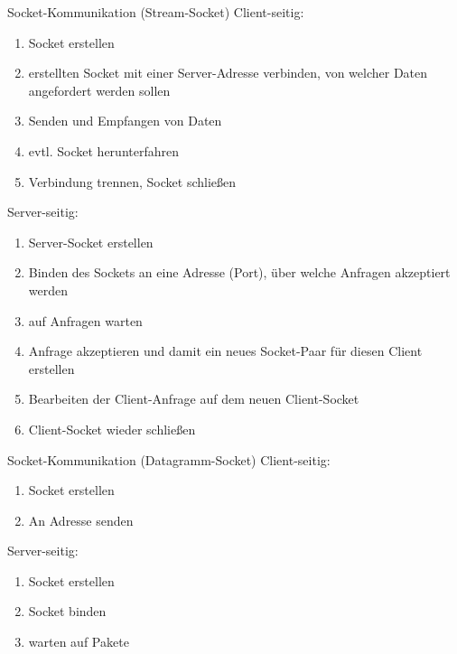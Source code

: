 \begin{defi}{Socket-Kommunikation (Stream-Socket)}
    Client-seitig:
    \begin{enumerate}
        \item Socket erstellen
        \item erstellten Socket mit einer Server-Adresse verbinden, von welcher Daten angefordert werden sollen
        \item Senden und Empfangen von Daten
        \item evtl. Socket herunterfahren
        \item Verbindung trennen, Socket schließen
    \end{enumerate}

    Server-seitig:
    \begin{enumerate}
        \item Server-Socket erstellen
        \item Binden des Sockets an eine Adresse (Port), über welche Anfragen akzeptiert werden
        \item auf Anfragen warten
        \item Anfrage akzeptieren und damit ein neues Socket-Paar für diesen Client erstellen
        \item Bearbeiten der Client-Anfrage auf dem neuen Client-Socket
        \item Client-Socket wieder schließen
    \end{enumerate}
\end{defi}

\begin{defi}{Socket-Kommunikation (Datagramm-Socket)}
    Client-seitig:
    \begin{enumerate}
        \item Socket erstellen
        \item An Adresse senden
    \end{enumerate}

    Server-seitig:
    \begin{enumerate}
        \item Socket erstellen
        \item Socket binden
        \item warten auf Pakete
    \end{enumerate}
\end{defi}

